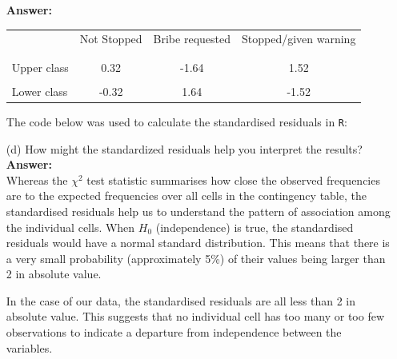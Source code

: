 \documentclass[12pt,letterpaper]{article}
\begin{document}
\begin{enumerate}
	\textbf{Answer:}\\
	
	\begin{table}[h]
		\centering
		\begin{tabular}{l | c c c }
			& Not Stopped & Bribe requested & Stopped/given warning \\
			\\[-1.8ex] 
			\hline \\[-1.8ex]
			Upper class  & 0.32 & -1.64 & 1.52 \\
			\\
			Lower class & -0.32 & 1.64  & -1.52  \\
			
		\end{tabular}
	\end{table}

	\vspace{.5cm}

	The code below was used to calculate the standardised residuals in \texttt{R}:
	
	\vspace{.5cm}
		
	  
	
	\vspace{.5cm}
		
	\item [(d)] How might the standardized residuals help you interpret the results?\\  
	
	\textbf{Answer:}\\
	
	Whereas the $\chi^2$ test statistic summarises how close the observed frequencies are to the expected frequencies over all cells in the contingency table, the standardised residuals help us to understand the pattern of association among the individual cells. When $H_0$ (independence) is true, the standardised residuals would have a normal standard distribution. This means that there is a very small probability (approximately 5\%) of their values being larger than 2 in absolute value.
	
	In the case of our data, the standardised residuals are all less than 2 in absolute value. This suggests that no individual cell has too many or too few observations to indicate a departure from independence between the variables.
	
\end{enumerate}
\newpage
\end{document}
